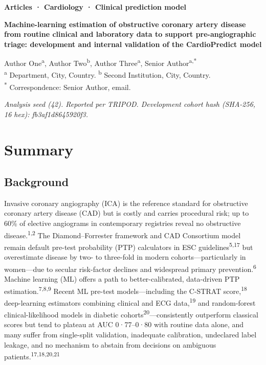\documentclass[english,11pt]{article}
\begin{document}
\vspace*{-8pt}
{\small\textbf{Articles · Cardiology · Clinical prediction model}}
\vspace{8pt}

{\LARGE\bfseries Machine-learning estimation of obstructive coronary artery disease from routine clinical and laboratory data to support pre-angiographic triage: development and internal validation of the CardioPredict model}

\vspace{8pt}
{\small Author One\textsuperscript{a}, Author Two\textsuperscript{b}, Author Three\textsuperscript{a}, Senior Author\textsuperscript{a,*} \\[2pt]
\textsuperscript{a} Department, City, Country. \textsuperscript{b} Second Institution, City, Country. \\[1pt]
\textsuperscript{*} Correspondence: Senior Author, email.}

\vspace{4pt}
{\small\itshape Analysis seed (42). Reported per TRIPOD. Development cohort hash (SHA-256, 16 hex): fb3af1d8645920f3.}
\vspace{10pt}

\section*{Summary}

\subsection*{Background}

Invasive coronary angiography (ICA) is the reference standard for obstructive coronary artery disease (CAD) but is costly and carries procedural risk; up to 60\% of elective angiograms in contemporary registries reveal no obstructive disease.\textsuperscript{1,2} The Diamond--Forrester framework and CAD Consortium model remain default pre-test probability (PTP) calculators in ESC guidelines\textsuperscript{5,17} but overestimate disease by two- to three-fold in modern cohorts---particularly in women---due to secular risk-factor declines and widespread primary prevention.\textsuperscript{6} Machine learning (ML) offers a path to better-calibrated, data-driven PTP estimation.\textsuperscript{7,8,9} Recent ML pre-test models---including the C-STRAT score,\textsuperscript{18} deep-learning estimators combining clinical and ECG data,\textsuperscript{19} and random-forest clinical-likelihood models in diabetic cohorts\textsuperscript{20}---consistently outperform classical scores but tend to plateau at AUC 0·77--0·80 with routine data alone, and many suffer from single-split validation, inadequate calibration, undeclared label leakage, and no mechanism to abstain from decisions on ambiguous patients.\textsuperscript{17,18,20,21}
\end{document}
